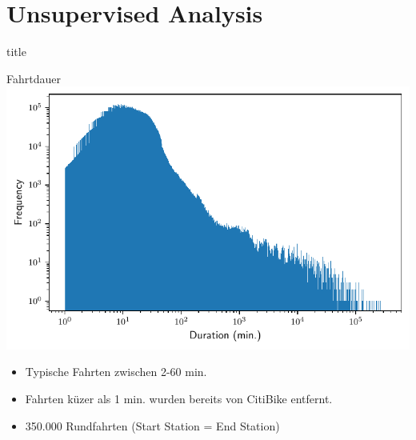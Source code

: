 \section{Unsupervised Analysis}

\begin{frame}

\begin{beamercolorbox}[sep=8pt,center]{title}
\end{beamercolorbox}
\end{frame}

\begin{frame}{Fahrtdauer}
\centering
\includegraphics[height=0.6\textheight]{../Images/Tripduration}
{
\myBlock[1]{}
{
\begin{itemize}
\item<1> Typische Fahrten zwischen 2-60 min.
\item<1> Fahrten küzer als 1 min. wurden bereits von CitiBike entfernt.
\item<1> 350.000 Rundfahrten (Start Station = End Station)
\end{itemize}
}
}
\end{frame}

